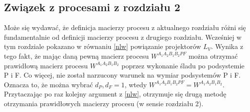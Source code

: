 \documentclass[10pt]{article} %
\newcommand{\Ket}[1]{|#1\rangle}
\newcommand{\Bra}[1]{\langle#1|}
\newcommand{\LPV}{{L^\perp_V}}
\begin{document}
\subsection{Związek z procesami z rozdziału 2}
Może się wydawać, że definicja macierzy procesu z aktualnego rozdziału różni się fundamentalnie od definicji macierzy procesu z drugiego rozdziału. Wcześniej w tym rozdziale pokazano w równaniu \eqref{nlw} powiązanie projektorów $L_V$. Wynika z tego fakt, że mając daną pewną macierz procesu $W^{A_1A_2B_1B_2PF}$ można otrzymać prawidłową macierz procesu $W^{A_1A_2B_1B_2}$ poprzez wykonanie śladu po podsystemie P i F. Co więcej, nie został narzucony warunek na wymiar podsystemów P i F. Oznacza to, że można wybrać $d_P, d_F = 1$, wtedy $W^{A_1A_2B_1B_2PF} = W^{A_1A_2B_1B_2}$. Przytaczając po raz kolejny argument z \eqref{nlw}, otrzymuje się drugą metodę otrzymania prawidłowych macierzy procesu (w sensie rozdziału 2).
\end{document}
